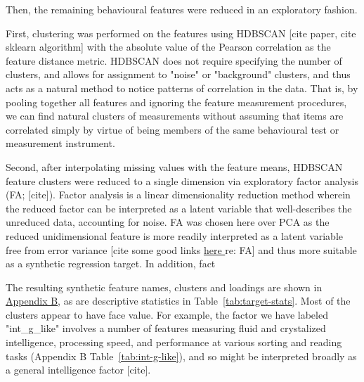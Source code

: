 \documentclass{article}
\begin{document}
Then, the remaining behavioural features were reduced in an exploratory
fashion.

First, clustering was performed on the features using HDBSCAN [cite
paper, cite sklearn algorithm] with the absolute value of the Pearson
correlation as the feature distance metric. HDBSCAN does not require
specifying the number of clusters, and allows for assignment to "noise" or
"background" clusters, and thus acts as a natural method to notice patterns
of correlation in the data. That is, by pooling together all features and
ignoring the feature measurement procedures, we can find natural clusters of measurements
without assuming that items are correlated simply by virtue of being members
of the same behavioural test or measurement instrument.

Second, after interpolating missing values with the feature means, HDBSCAN
feature clusters were reduced to a single dimension via exploratory factor
analysis (FA; [cite]). Factor analysis is a linear dimensionality reduction
method wherein the reduced factor can be interpreted as a latent variable
that well-describes the unreduced data, accounting for noise. FA was chosen
here over PCA as the reduced unidimensional feature is more readily
interpreted as a latent variable free from error variance [cite some good
links
\href{https://en.wikipedia.org/w/index.php?title=Factor\_analysis&oldid=1223130166#Exploratory\_factor\_analysis\_(EFA)\_versus\_principal\_components\_analysis\_(PCA)}{here
} re: FA] and thus more suitable as a synthetic regression target. In
addition, fact \cite{attiasIndependentFactorAnalysis1999}

The resulting synthetic feature names, clusters and loadings are shown in
\hyperref[sec:appendix-b]{Appendix B}, as are descriptive statistics in Table~\ref{tab:target-stats}.
Most of the clusters appear to have face value. For example, the factor we
have labeled "int\_g\_like" involves a number of features measuring fluid and
crystalized intelligence, processing speed, and performance at various
sorting and reading tasks (Appendix B Table~\ref{tab:int-g-like}), and so
might be interpreted broadly as a general intelligence factor [cite].
\end{document}
